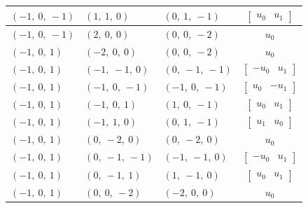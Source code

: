 \documentclass[11pt]{article}
\theoremstyle{definition}
\begin{document}
\begin{longtable}{|l|l|l|c|}
    \hline
    $\left( -1, \  0, \  -1\right)$ & $\left( 1, \  1, \  0\right)$ & $\left( 0, \  1, \  -1\right)$ & $\left[\begin{matrix}u_{0} & u_{1}\end{matrix}\right]$ \\
    \hline
    $\left( -1, \  0, \  -1\right)$ & $\left( 2, \  0, \  0\right)$ & $\left( 0, \  0, \  -2\right)$ & $u_{0}$ \\
    \hline
    $\left( -1, \  0, \  1\right)$ & $\left( -2, \  0, \  0\right)$ & $\left( 0, \  0, \  -2\right)$ & $u_{0}$ \\
    \hline
    $\left( -1, \  0, \  1\right)$ & $\left( -1, \  -1, \  0\right)$ & $\left( 0, \  -1, \  -1\right)$ & $\left[\begin{matrix}- u_{0} & u_{1}\end{matrix}\right]$ \\
    \hline
    $\left( -1, \  0, \  1\right)$ & $\left( -1, \  0, \  -1\right)$ & $\left( -1, \  0, \  -1\right)$ & $\left[\begin{matrix}u_{0} & - u_{1}\end{matrix}\right]$ \\
    \hline
    $\left( -1, \  0, \  1\right)$ & $\left( -1, \  0, \  1\right)$ & $\left( 1, \  0, \  -1\right)$ & $\left[\begin{matrix}u_{0} & u_{1}\end{matrix}\right]$ \\
    \hline
    $\left( -1, \  0, \  1\right)$ & $\left( -1, \  1, \  0\right)$ & $\left( 0, \  1, \  -1\right)$ & $\left[\begin{matrix}u_{1} & u_{0}\end{matrix}\right]$ \\
    \hline
    $\left( -1, \  0, \  1\right)$ & $\left( 0, \  -2, \  0\right)$ & $\left( 0, \  -2, \  0\right)$ & $u_{0}$ \\
    \hline
    $\left( -1, \  0, \  1\right)$ & $\left( 0, \  -1, \  -1\right)$ & $\left( -1, \  -1, \  0\right)$ & $\left[\begin{matrix}- u_{0} & u_{1}\end{matrix}\right]$ \\
    \hline
    $\left( -1, \  0, \  1\right)$ & $\left( 0, \  -1, \  1\right)$ & $\left( 1, \  -1, \  0\right)$ & $\left[\begin{matrix}u_{0} & u_{1}\end{matrix}\right]$ \\
    \hline
    $\left( -1, \  0, \  1\right)$ & $\left( 0, \  0, \  -2\right)$ & $\left( -2, \  0, \  0\right)$ & $u_{0}$ \\

\end{longtable}
\end{document}
